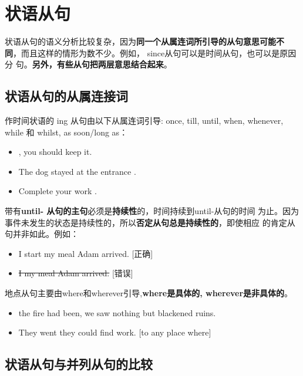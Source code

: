 \chapter{状语从句}

状语从句的语义分析比较复杂，因为\textbf{同一个从属连词所引导的从句意思可能不
  同}，而且这样的情形为数不少。例如， since从句可以是时间从句，也可以是原因分
句。\textbf{另外，有些从句把两层意思结合起来}。

\section{状语从句的从属连接词}


作时间状语的 ing 从句由以下从属连词引导: once, till, until, when, whenever,
while 和 whilst, as soon/long as：
\begin{itemize}
\item {}, you should keep it.
\item The dog stayed at the entrance .
\item Complete your work .
\end{itemize}

带有\textbf{until- 从句的主句}必须是\textbf{持续性}的，时间持续到until-从句的时间
为止。因为事件未发生的状态是持续性的，所以\textbf{否定从句总是持续性的}，即使相应
的肯定从句并非如此。例如：
\begin{itemize}
\item I  start my meal  Adam arrived. [正确]
\item \sout{I  my meal  Adam arrived.} [错误]
\end{itemize}


地点从句主要由where和wherever引导,\textbf{where是具体的, wherever是非具体的}。
\begin{itemize}
\item {} the fire had been, we saw nothing but blackened ruins.

\item They went  they could find work. [to any place where]
\end{itemize}



\section{状语从句与并列从句的比较}


